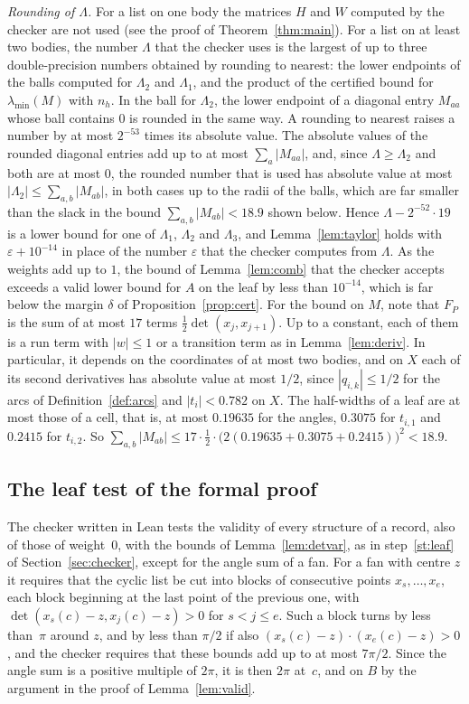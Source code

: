 \documentclass[11pt]{amsart}
\theoremstyle{definition}
\theoremstyle{remark}
\numberwithin{equation}{section}
\newcommand{\lmin}{\lambda_{\min}}
\newcommand{\HWX}{0.3075}
\newcommand{\HWY}{0.2415}
\newcommand{\MBOUND}{18.9}
\begin{document}
\emph{Rounding of $\Lambda$.} For a list on one body the matrices $H$ and $W$ computed by the checker are not used (see the proof of Theorem~\ref{thm:main}). For a list on at least two bodies, the number $\Lambda$ that the checker uses is the largest of up to three double-precision numbers obtained by rounding to nearest: the lower endpoints of the balls computed for $\Lambda_2$ and $\Lambda_1$, and the product of the certified bound for $\lmin(M)$ with $n_h$. In the ball for $\Lambda_2$, the lower endpoint of a diagonal entry $M_{aa}$ whose ball contains $0$ is rounded in the same way. A rounding to nearest raises a number by at most $2^{-53}$ times its absolute value. The absolute values of the rounded diagonal entries add up to at most $\sum_a|M_{aa}|$, and, since $\Lambda\ge\Lambda_2$ and both are at most $0$, the rounded number that is used has absolute value at most $|\Lambda_2|\le\sum_{a,b}|M_{ab}|$, in both cases up to the radii of the balls, which are far smaller than the slack in the bound $\sum_{a,b}|M_{ab}|<\MBOUND$ shown below. Hence $\Lambda-2^{-52}\cdot19$ is a lower bound for one of $\Lambda_1$, $\Lambda_2$ and $\Lambda_3$, and Lemma~\ref{lem:taylor} holds with $\varepsilon+10^{-14}$ in place of the number $\varepsilon$ that the checker computes from $\Lambda$. As the weights add up to $1$, the bound of Lemma~\ref{lem:comb} that the checker accepts exceeds a valid lower bound for $A$ on the leaf by less than $10^{-14}$, which is far below the margin $\delta$ of Proposition~\ref{prop:cert}. For the bound on $M$, note that $F_P$ is the sum of at most $17$ terms $\frac12\det(x_j,x_{j+1})$. Up to a constant, each of them is a run term with $|w|\le1$ or a transition term as in Lemma~\ref{lem:deriv}. In particular, it depends on the coordinates of at most two bodies, and on $X$ each of its second derivatives has absolute value at most $1/2$, since $|q_{i,k}|\le1/2$ for the arcs of Definition~\ref{def:arcs} and $|t_i|<0.782$ on $X$. The half-widths of a leaf are at most those of a cell, that is, at most $0.19635$ for the angles, $\HWX$ for $t_{i,1}$ and $\HWY$ for $t_{i,2}$. So $\sum_{a,b}|M_{ab}|\le17\cdot\frac12\cdot\bigl(2(0.19635+\HWX+\HWY)\bigr)^2<\MBOUND$.

\subsection{The leaf test of the formal proof}\label{app:leanleaf}
The checker written in Lean tests the validity of every structure of a record, also of those of weight~$0$, with the bounds of Lemma~\ref{lem:detvar}, as in step~\ref{st:leaf} of Section~\ref{sec:checker}, except for the angle sum of a fan. For a fan with centre $z$ it requires that the cyclic list be cut into blocks of consecutive points $x_s,\dots,x_e$, each block beginning at the last point of the previous one, with $\det(x_s(c)-z,x_j(c)-z)>0$ for $s<j\le e$. Such a block turns by less than~$\pi$ around $z$, and by less than $\pi/2$ if also $(x_s(c)-z)\cdot(x_e(c)-z)>0$, and the checker requires that these bounds add up to at most $7\pi/2$. Since the angle sum is a positive multiple of $2\pi$, it is then $2\pi$ at~$c$, and on $B$ by the argument in the proof of Lemma~\ref{lem:valid}.
\end{document}
